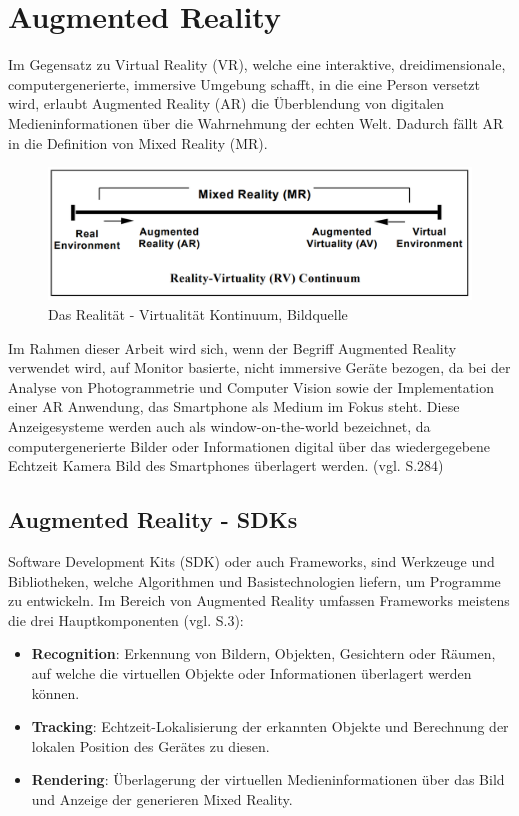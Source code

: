 \chapter{Augmented Reality}

Im Gegensatz zu \glqq Virtual Reality\grqq{} (VR), welche eine interaktive, dreidimensionale, computergenerierte, immersive Umgebung schafft, in die eine Person versetzt wird, erlaubt \glqq Augmented Reality\grqq{} (AR) die Überblendung von digitalen Medieninformationen über die Wahrnehmung der echten Welt. Dadurch fällt AR in die Definition von \glqq Mixed Reality\grqq{} (MR).

\begin{figure}[H]
	\centering
	\includegraphics[scale=0.52]{ar_vr.png}
	\caption{Das Realität - Virtualität Kontinuum, Bildquelle \cite{ar_vr}}
\end{figure} 

Im Rahmen dieser Arbeit wird sich, wenn der Begriff Augmented Reality verwendet wird, auf Monitor basierte, nicht immersive Geräte bezogen, da bei der Analyse von Photogrammetrie und Computer Vision sowie der Implementation einer AR Anwendung, das Smartphone als Medium im Fokus steht. Diese Anzeigesysteme werden auch als \glqq window-on-the-world\grqq{} bezeichnet, da computergenerierte Bilder oder Informationen digital über das wiedergegebene Echtzeit Kamera Bild des Smartphones überlagert werden. (vgl. \cite{ar_vr} S.284)



\section{Augmented Reality - SDKs}

\glqq Software Development Kits\grqq{} (SDK) oder auch Frameworks, sind Werkzeuge und Bibliotheken, welche Algorithmen und Basistechnologien liefern, um Programme zu entwickeln. Im Bereich von Augmented Reality umfassen Frameworks meistens die drei Hauptkomponenten (vgl. \cite{sdks} S.3):

\begin{itemize}

\item \textbf{Recognition}: Erkennung von Bildern, Objekten, Gesichtern oder Räumen, auf welche die virtuellen Objekte oder Informationen überlagert werden können.


\item \textbf{Tracking}: Echtzeit-Lokalisierung der erkannten Objekte und Berechnung der lokalen Position des Gerätes zu diesen.

\item \textbf{Rendering}: Überlagerung der virtuellen Medieninformationen über das Bild und Anzeige der generieren Mixed Reality.
\end{itemize}

